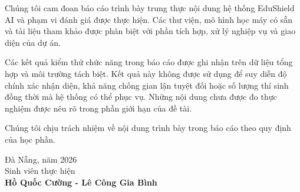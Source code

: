 \begin{declaration}
Chúng tôi cam đoan báo cáo trình bày trung thực nội dung hệ thống EduShield AI và phạm vi đánh giá được thực hiện. Các thư viện, mô hình học máy có sẵn và tài liệu tham khảo được phân biệt với phần tích hợp, xử lý nghiệp vụ và giao diện của dự án.

Các kết quả kiểm thử chức năng trong báo cáo được ghi nhận trên dữ liệu tổng hợp và môi trường tách biệt. Kết quả này không được sử dụng để suy diễn độ chính xác nhận diện, khả năng chống gian lận tuyệt đối hoặc số lượng thí sinh đồng thời mà hệ thống có thể phục vụ. Những nội dung chưa được đo thực nghiệm được nêu rõ trong phần giới hạn của đề tài.

Chúng tôi chịu trách nhiệm về nội dung trình bày trong báo cáo theo quy định của học phần.
\vspace{1cm}
\begin{flushright}
Đà Nẵng, năm 2026\\[0.5cm]
Sinh viên thực hiện\\[1.8cm]
\textbf{Hồ Quốc Cường - Lê Công Gia Bình}
\end{flushright}
\end{declaration}
